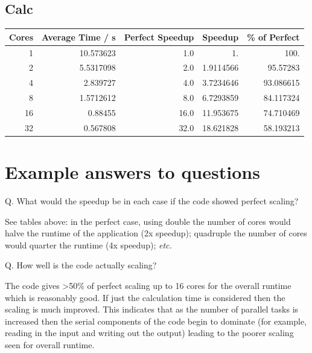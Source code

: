 \documentclass{article}
\begin{document}
\subsection{Calc}
\label{sec-3.2}


\begin{center}
\begin{tabular}{rrrrr}
 Cores  &  Average Time / s  &  Perfect Speedup  &    Speedup  &  \% of Perfect  \\
\hline
     1  &     10.573623  &              1.0  &         1.  &           100.  \\
     2  &     5.5317098  &              2.0  &  1.9114566  &       95.57283  \\
     4  &      2.839727  &              4.0  &  3.7234646  &      93.086615  \\
     8  &     1.5712612  &              8.0  &  6.7293859  &      84.117324  \\
    16  &       0.88455  &             16.0  &  11.953675  &      74.710469  \\
    32  &      0.567808  &             32.0  &  18.621828  &      58.193213  \\
\end{tabular}
\end{center}



\section{Example answers to questions}
\label{sec-4}



Q. What would the speedup be in each case if the code showed perfect
   scaling?

See tables above: in the perfect case, using double the number of
cores would halve the runtime of the application (2x speedup);
quadruple the number of cores would quarter the runtime (4x speedup);
\emph{etc.}


Q. How well is the code actually scaling?

The code gives >50\% of perfect scaling up to 16 cores for the overall
runtime which is reasonably good. If just the calculation time is
considered then the scaling is much improved. This indicates that as
the number of parallel tasks is increased then the serial components
of the code begin to dominate (for example, reading in the input and
writing out the output) leading to the poorer scaling seen for
overall runtime.
\end{document}
